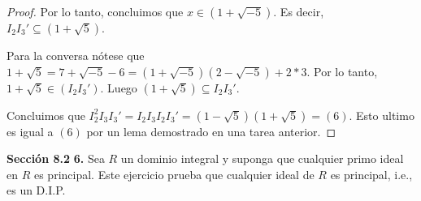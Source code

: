 \documentclass[letter,twoside,12pt]{article}
\begin{document}
\begin{enumerate}[label=\textbf{(\alph*)}]
\begin{proof}
Por lo tanto, concluimos que $ x \in (1+\sqrt{-5}) $. Es decir, $I_2I_3' \subseteq (1+\sqrt{5}) $. 

Para la conversa nótese que $ 1+\sqrt{5} = 7+\sqrt{-5}-6 = (1+\sqrt{-5})(2-\sqrt{-5})+2*3$. Por lo tanto, $ 1+\sqrt{5} \in (I_2I_3')$. Luego $ (1+\sqrt{5}) \subseteq I_2I_3' $.

Concluimos que $ I_2^2I_3I_3'=I_2I_3I_2I_3' = (1-\sqrt{5})(1+\sqrt{5})=(6)$. Esto ultimo es igual a $ (6) $ por un lema demostrado en una tarea anterior.

\end{proof}
\end{enumerate}
\newpage \textbf{Sección 8.2} \textbf{6.} Sea $ R $ un dominio integral y suponga que cualquier primo ideal en $ R $ es principal. Este ejercicio prueba que cualquier ideal de $ R $ es principal, i.e., es un D.I.P.
\end{document}
